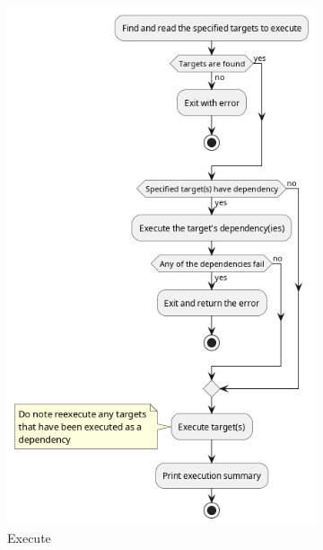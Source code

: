 \documentclass[11pt]{article}
\begin{document}
\begin{figure}[htbp]
\begin{minipage}{0.45\textwidth}
    \begin{subfigure}[b]{\linewidth}
      \includegraphics[width=\linewidth]{diags/activity_002.png}
      \caption{Execute}
    \end{subfigure}
  \end{minipage}
  \hfill
  \begin{minipage}{0.5\textwidth}
    \addtocounter{subfigure}{-2}
    \begin{subfigure}[b]{\linewidth}

\end{subfigure}
\end{minipage}
\end{figure}
\end{document}
